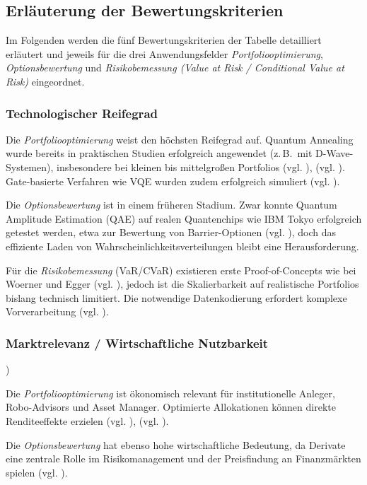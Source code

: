 {\subsection*{Erläuterung der Bewertungskriterien}

Im Folgenden werden die fünf Bewertungskriterien der Tabelle detailliert erläutert und jeweils für die drei Anwendungsfelder \textit{Portfoliooptimierung}, \textit{Optionsbewertung} und \textit{Risikobemessung (Value at Risk / Conditional Value at Risk)} eingeordnet.

\subsubsection*{Technologischer Reifegrad}

Die \textit{Portfoliooptimierung} weist den höchsten Reifegrad auf. Quantum Annealing wurde bereits in praktischen Studien erfolgreich angewendet (z.\,B.\ mit D-Wave-Systemen), insbesondere bei kleinen bis mittelgroßen Portfolios (vgl. \cite{rosenberg_finding_2016}), (vgl. \cite{mugel_dynamic_2022}). Gate-basierte Verfahren wie VQE wurden zudem erfolgreich simuliert (vgl. \cite{egger_quantum_2020}).

Die \textit{Optionsbewertung} ist in einem früheren Stadium. Zwar konnte Quantum Amplitude Estimation (QAE) auf realen Quantenchips wie IBM Tokyo erfolgreich getestet werden, etwa zur Bewertung von Barrier-Optionen (vgl. \cite{stamatopoulos_option_2020}), doch das effiziente Laden von Wahrscheinlichkeitsverteilungen bleibt eine Herausforderung.

Für die \textit{Risikobemessung} (VaR/CVaR) existieren erste Proof-of-Concepts wie bei Woerner und Egger (vgl. \cite{orus_quantum_2019}), jedoch ist die Skalierbarkeit auf realistische Portfolios bislang technisch limitiert. Die notwendige Datenkodierung erfordert komplexe Vorverarbeitung (vgl. \cite{zoufal_quantum_2019}).

\subsubsection*{Marktrelevanz / Wirtschaftliche Nutzbarkeit})

Die \textit{Portfoliooptimierung} ist ökonomisch relevant für institutionelle Anleger, Robo-Advisors und Asset Manager. Optimierte Allokationen können direkte Renditeeffekte erzielen (vgl. \cite{sakuler_real-world_2025}), (vgl. \cite{mugel_dynamic_2022}).

Die \textit{Optionsbewertung} hat ebenso hohe wirtschaftliche Bedeutung, da Derivate eine zentrale Rolle im Risikomanagement und der Preisfindung an Finanzmärkten spielen (vgl. \cite{stamatopoulos_option_2020}).

}
